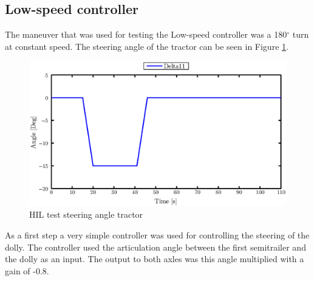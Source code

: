\documentclass[ExampleMasters.tex]{subfiles}
\begin{document}
%	

\subsection{Low-speed controller}
The maneuver that was used for testing the Low-speed controller was a 180$^{\circ}$ turn at constant speed. The steering angle of the tractor can be seen in Figure \ref{fig:HIL002_delta11}.\\
\begin{figure}[!htb]
	\centering
	\includegraphics[width=0.7\linewidth]{figures/HIL_delta11}
	\caption{HIL test steering angle tractor}
	
	\label{fig:HIL002_delta11}
\end{figure}
As a first step a very simple controller was used for controlling the steering of the dolly. The controller used the articulation angle between the first semitrailer and the dolly as an input. The output to both axles was this angle multiplied with a gain of -0.8.
\end{document}

